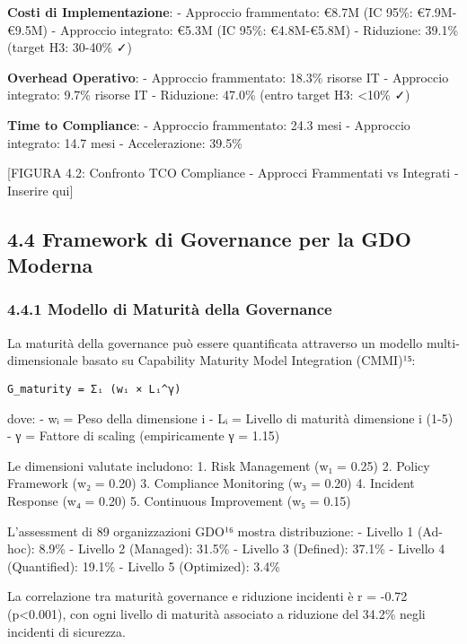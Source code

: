 \documentclass{report}
\begin{document}
\textbf{Costi di Implementazione}: - Approccio frammentato: €8.7M (IC
95\%: €7.9M-€9.5M) - Approccio integrato: €5.3M (IC 95\%: €4.8M-€5.8M) -
Riduzione: 39.1\% (target H3: 30-40\% ✓)

\textbf{Overhead Operativo}: - Approccio frammentato: 18.3\% risorse IT
- Approccio integrato: 9.7\% risorse IT - Riduzione: 47.0\% (entro
target H3: \textless10\% ✓)

\textbf{Time to Compliance}: - Approccio frammentato: 24.3 mesi -
Approccio integrato: 14.7 mesi - Accelerazione: 39.5\%

{[}FIGURA 4.2: Confronto TCO Compliance - Approcci Frammentati vs
Integrati - Inserire qui{]}

\subsection{4.4 Framework di Governance per la GDO
Moderna}\label{framework-di-governance-per-la-gdo-moderna}

\subsubsection{4.4.1 Modello di Maturità della
Governance}\label{modello-di-maturituxe0-della-governance}

La maturità della governance può essere quantificata attraverso un
modello multi-dimensionale basato su Capability Maturity Model
Integration (CMMI)¹⁵:

\begin{verbatim}
G_maturity = Σᵢ (wᵢ × Lᵢ^γ)
\end{verbatim}

dove: - wᵢ = Peso della dimensione i - Lᵢ = Livello di maturità
dimensione i (1-5) - γ = Fattore di scaling (empiricamente γ = 1.15)

Le dimensioni valutate includono: 1. Risk Management (w₁ = 0.25) 2.
Policy Framework (w₂ = 0.20) 3. Compliance Monitoring (w₃ = 0.20) 4.
Incident Response (w₄ = 0.20) 5. Continuous Improvement (w₅ = 0.15)

L'assessment di 89 organizzazioni GDO¹⁶ mostra distribuzione: - Livello
1 (Ad-hoc): 8.9\% - Livello 2 (Managed): 31.5\% - Livello 3 (Defined):
37.1\% - Livello 4 (Quantified): 19.1\% - Livello 5 (Optimized): 3.4\%

La correlazione tra maturità governance e riduzione incidenti è r =
-0.72 (p\textless0.001), con ogni livello di maturità associato a
riduzione del 34.2\% negli incidenti di sicurezza.
\end{document}

